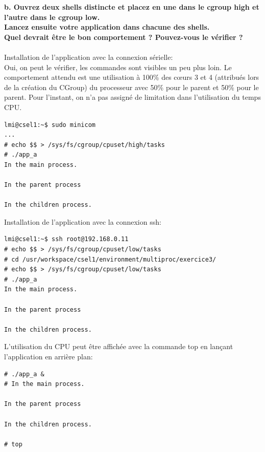 \textbf{b. Ouvrez	deux	shells	distincte	et	placez en	une	dans	le	cgroup	high	et	l’autre	dans	le	cgroup	low.\\	
	Lancez	ensuite	votre	application	dans	chacune	des	shells.\\
	Quel	devrait	être	le	bon	comportement ?	Pouvez-vous	le	vérifier ?}\\\\
Installation de l'application avec la connexion sérielle: \\
Oui, on peut le vérifier, les commandes sont visibles un peu plus loin. Le comportement attendu est une utilisation à 100\% des cœurs 3 et 4 (attribués lors de la création du CGroup) du processeur avec 50\% pour le parent et 50\% pour le parent. Pour l'instant, on n'a pas assigné de limitation dans l'utilisation du temps CPU.\\
\begin{lstlisting}
lmi@csel1:~$ sudo minicom
...
# echo $$ > /sys/fs/cgroup/cpuset/high/tasks                                    
# ./app_a                                                                       
In the main process.                                                            

In the parent process                                                           

In the children process.  
\end{lstlisting}
Installation de l'application avec la connexion ssh: \\
\begin{lstlisting}
lmi@csel1:~$ ssh root@192.168.0.11
# echo $$ > /sys/fs/cgroup/cpuset/low/tasks
# cd /usr/workspace/csel1/environment/multiproc/exercice3/
# echo $$ > /sys/fs/cgroup/cpuset/low/tasks    
# ./app_a 
In the main process.

In the parent process

In the children process.

\end{lstlisting}

L'utilisation du CPU peut être affichée avec la commande top en lançant l'application en arrière plan:\\
\begin{lstlisting}
# ./app_a &                                                                     
# In the main process.                                                          

In the parent process                                                           

In the children process.  

# top
\end{lstlisting}

